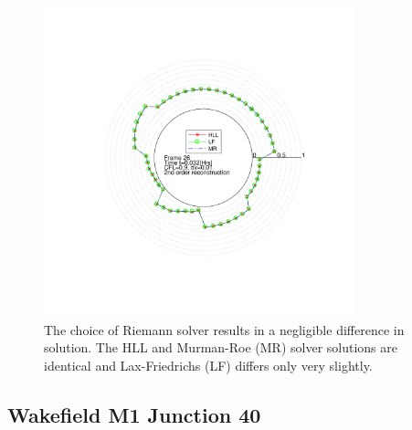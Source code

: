 	\begin{figure}
    		\centering
        		\includegraphics[trim=100 100 80 80,clip,width=0.8\textwidth]{ReDiRoma_riem.pdf}
		\caption[Re Di Roma : Riemann solvers]{The choice of Riemann solver results in a negligible difference in solution. The HLL and Murman-Roe (MR) solver solutions are identical and Lax-Friedrichs (LF) differs only very slightly.}
		\label{fig:randd:rediroma:riem}
	\end{figure}
	
\subsection{Wakefield M1 Junction 40}
\label{sec:randd:M1J40}

